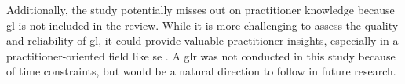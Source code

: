 Additionally, the study potentially misses out on practitioner knowledge because \acrshort{gl} is not included in the review.
While it is more challenging to assess the quality and reliability of \acrshort{gl}, it could provide valuable practitioner insights, especially in a practitioner-oriented field like \acrshort{se} \cite{Garousi2016}.
A \acrshort{glr} was not conducted in this study because of time constraints, but would be a natural direction to follow in future research.

